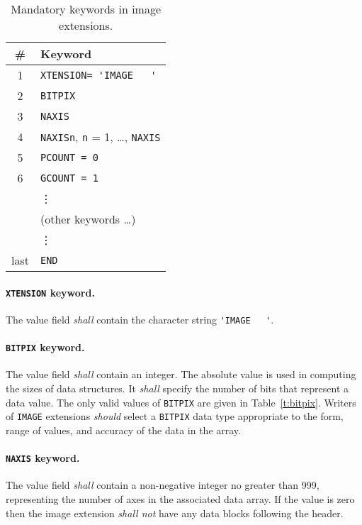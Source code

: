 \documentclass[onecolumn]{aa}
\begin{document}
\begin{table}
\centering
\caption{Mandatory keywords in image extensions.}
\label{t:hdr4}
\begin{tabular}{cl} 
\hline \hline
\# & Keyword  \\
\hline
       1 & {\verb*+XTENSION= 'IMAGE   '+} \\
       2 & {\tt BITPIX} \\
       3 & {\tt NAXIS} \\
       4 & {\tt NAXISn}, {\tt n} = 1, \ldots, {\tt NAXIS} \\
       5 & {\tt PCOUNT = 0} \\
       6 & {\tt GCOUNT = 1} \\
         & \vdots \\
         & (other keywords \ldots ) \\
         & \vdots \\
    last  & {\tt END} \\
\hline
\end{tabular}
\end{table}

   \paragraph{{\tt XTENSION} keyword.}
 The value field {\em shall} contain the
 character string  \verb*+'IMAGE   '+.
  
   \paragraph{{\tt BITPIX} keyword.}
 The value field {\em shall} contain an integer.  The
 absolute value is used 
 in computing the sizes of data structures.  It {\em shall} specify
 the number of bits that represent a data value. The only valid values 
 of {\tt BITPIX} are given in Table~\ref{t:bitpix}.
Writers of {\tt IMAGE} extensions {\em should} select a {\tt BITPIX} data type 
appropriate to the form, range of values, and accuracy of the data in the array.

   \paragraph{{\tt NAXIS} keyword.}
 The value field {\em shall} contain a non-negative integer no greater than
 999, representing the number of axes in the associated data
 array. If the value is zero then the image extension
 {\em shall not} have any data blocks following the
 header.
\end{document}

